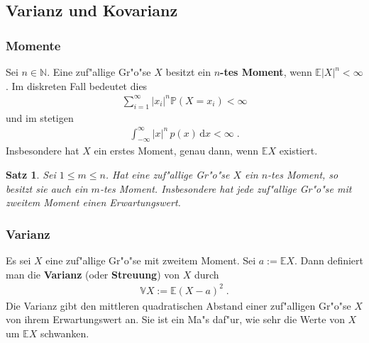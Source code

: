 \documentclass[ngerman,draft,parskip=half,twoside]{scrartcl}
\newtheorem{thm}{Satz}[section]
\newcommand*{\N}{\mathbb{N}}      %
\newcommand*{\E}{\mathbb{E}}        %
\newcommand*{\V}{\mathbb{V}}        %
\newcommand*{\WKM}{\mathbb{P}}      %
\begin{document}
\subsection{Varianz und Kovarianz}
\subsubsection{Momente}
Sei $n\in\N$. Eine zuf"allige Gr"o"se $X$ besitzt ein \textbf{$n$-tes Moment}, wenn
$\E|X|^n<\infty$ . Im diskreten Fall bedeutet dies
\begin{gather*}
  \sum_{i=1}^\infty |x_i|^n\WKM(X=x_i)<\infty
\end{gather*}
und im stetigen
\begin{gather*}
  \int_{-\infty}^\infty |x|^n\,p(x)\,\mathrm d x<\infty\;.
\end{gather*}
Insbesondere hat $X$ ein erstes Moment, genau dann, wenn $\E X$ existiert.
\begin{thm}
Sei $1\le m\le n$. Hat eine zuf"allige Gr"o"se $X$ ein $n$-tes Moment, so besitzt sie auch ein $m$-tes Moment.
Insbesondere hat jede zuf"allige Gr"o"se mit zweitem Moment einen Erwartungswert.
\end{thm}
\subsubsection{Varianz}
Es sei $X$ eine zuf"allige Gr"o"se mit zweitem Moment. Sei $a:=\E X$. Dann definiert man
die \textbf{Varianz} (oder \textbf{Streuung}) von $X$ durch
\begin{gather*}
  \V X:= \E(X-a)^2\;.
\end{gather*}
Die Varianz gibt den mittleren quadratischen Abstand einer zuf"alligen Gr"o"se $X$ von ihrem
Erwartungswert an. Sie ist ein Ma"s daf"ur, wie sehr die Werte von $X$ um $\E X$ schwanken.
\end{document}
